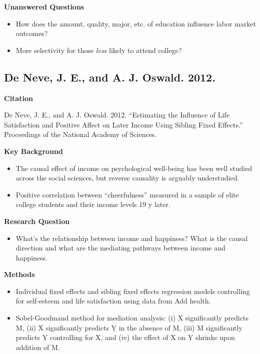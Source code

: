 \documentclass[
]{book}
\providecommand{\tightlist}{%
  \setlength{\itemsep}{0pt}\setlength{\parskip}{0pt}}
\begin{document}
\textbf{Unanswered Questions}

\begin{itemize}
\tightlist
\item
  How does the amount, quality, major, etc. of education influence labor market outcomes?
\item
  More selectivity for those \emph{less} likely to attend college?
\end{itemize}

\hypertarget{de-neve-j.-e.-and-a.-j.-oswald.-2012.}{%
\subsection*{De Neve, J. E., and A. J. Oswald. 2012.}\label{de-neve-j.-e.-and-a.-j.-oswald.-2012.}}

\textbf{Citation}

De Neve, J. E., and A. J. Oswald. 2012. ``Estimating the Influence of Life Satisfaction and Positive Affect on Later Income Using Sibling Fixed Effects.'' Proceedings of the National Academy of Sciences.

\textbf{Key Background}

\begin{itemize}
\tightlist
\item
  The causal effect of income on psychological well-being has been well studied across the social sciences, but reverse causality is arguably understudied.
\item
  Positive correlation between ``cheerfulness'' measured in a sample of elite college students and their income levels 19 y later.
\end{itemize}

\textbf{Research Question}

\begin{itemize}
\tightlist
\item
  What's the relationship between income and happiness? What is the causal direction and what are the mediating pathways between income and happiness.
\end{itemize}

\textbf{Methods}

\begin{itemize}
\tightlist
\item
  Individual fixed effects and sibling fixed effects regression models controlling for self-esteem and life satisfaction using data from Add health.\\
\item
  Sobel-Goodmand method for mediation analysis: (i) X significantly predicts M, (ii) X significantly predicts Y in the absence of M, (iii) M significantly predicts Y controlling for X, and (iv) the effect of X on Y shrinks upon addition of M.
\end{itemize}
\end{document}
